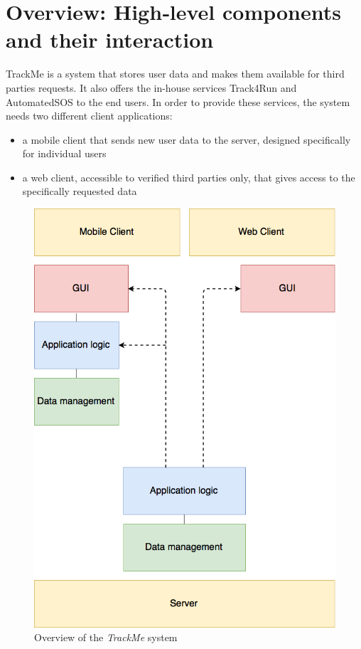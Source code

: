 \section{Overview: High‐level components and their interaction}

TrackMe is a system that stores user data and makes them available for third parties requests. It also offers the in-house services Track4Run and AutomatedSOS to the end users. In order to provide these services, the system needs two different client applications: 

\begin{itemize}[leftmargin=*]
        \item{a mobile client that sends new user data to the server, designed specifically for individual users}
        \item{a web client, accessible to verified third parties only, that gives access to the specifically requested data}
\end{itemize}

\begin{figure}[H]
\includegraphics[scale=0.3,keepaspectratio]{./Pictures/arch-design.png}
\centering
\caption{Overview of the \textit{TrackMe} system}
\end{figure}

